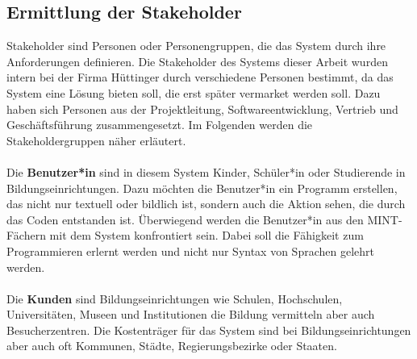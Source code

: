 \subsection{Ermittlung der Stakeholder}
Stakeholder sind Personen oder Personengruppen, die das System durch ihre Anforderungen definieren. \cite[S.18 f]{Anforderungsmanagemet.2014} Die Stakeholder des Systems dieser Arbeit wurden intern bei der Firma Hüttinger durch verschiedene Personen bestimmt, da das System eine Lösung bieten soll, die erst später vermarket werden soll. Dazu haben sich Personen aus der Projektleitung, Softwareentwicklung, Vertrieb und Geschäftsführung zusammengesetzt. Im Folgenden werden die Stakeholdergruppen näher erläutert. \\\\
Die \textbf{Benutzer*in} sind in diesem System Kinder, Schüler*in oder Studierende in Bildungseinrichtungen. Dazu möchten die Benutzer*in ein Programm erstellen, das nicht nur textuell oder bildlich ist, sondern auch die Aktion sehen, die durch das Coden entstanden ist. Überwiegend werden die Benutzer*in aus den MINT-Fächern mit dem System konfrontiert sein. Dabei soll die Fähigkeit zum Programmieren erlernt werden und nicht nur Syntax von Sprachen gelehrt werden.  
\\\\
Die \textbf{Kunden} sind Bildungseinrichtungen wie Schulen, Hochschulen, Universitäten, Museen und Institutionen die Bildung vermitteln aber auch Besucherzentren. Die Kostenträger für das System sind bei Bildungseinrichtungen aber auch oft Kommunen, Städte, Regierungsbezirke oder Staaten.

